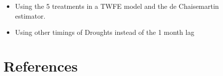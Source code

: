 \documentclass[12pt, oneside]{article}      %
\begin{document}
\begin{itemize}
    \item Using the 5 treatments in a TWFE model and the de Chaisemartin estimator.
    \item Using other timings of Droughts instead of the 1 month lag
\end{itemize}





\newpage
\clearpage
 
\section*{References}
\nocite{*}
\begingroup
\singlespacing
\renewcommand{\section}[2]{}%
\begin{spacing}{2}

\end{spacing}
\endgroup
\clearpage



\appendix
\clearpage
\newpage
\section*{Appendix}
\setcounter{figure}{0} \renewcommand{\thefigure}{A.\arabic{figure}}
\setcounter{table}{0} \renewcommand{\thetable}{A.\arabic{table}}
\end{document}
